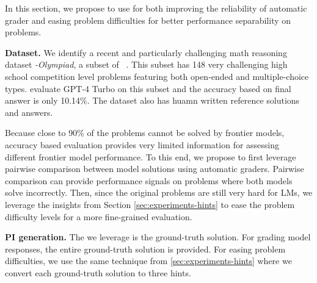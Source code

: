In this section, we propose to use \PI for both improving the reliability of automatic grader and easing problem difficulties for better performance separability on \NS problems. 

\textbf{Dataset.} We identify a recent and particularly challenging math reasoning dataset \MathOdyssey\emph{-Olympiad}, a subset of \MathOdyssey~\citep{Fang2024-go}. This subset has 148 very challenging high school competition level problems featuring both open-ended and multiple-choice types. \citet{Fang2024-go} evaluate GPT-4 Turbo on this subset and the accuracy based on final answer is only 10.14\%. The dataset also has huamn written reference solutions and answers.

Because close to 90\% of the problems cannot be solved by frontier models, accuracy based evaluation provides very limited information for assessing different frontier model performance. To this end, we propose to first leverage pairwise comparison between model solutions using automatic graders. Pairwise comparison can provide performance signals on problems where both models solve incorrectly. Then, since the original problems are still very hard for \NS LMs, we leverage the insights from Section \ref{sec:experiments-hints} to ease the problem difficulty levels for a more fine-grained evaluation.

\textbf{PI generation.} The \PI we leverage is the ground-truth solution. For grading model responses, the entire ground-truth solution is provided. For easing problem difficulties, we use the same technique from \ref{sec:experiments-hints} where we convert each ground-truth solution to three hints.



